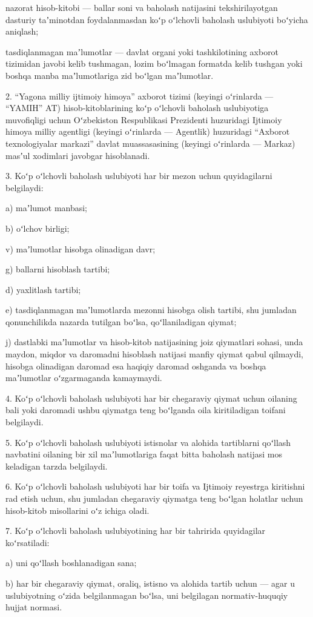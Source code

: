 \documentclass[14pt,a4paper]{extarticle}
\newcommand{\norm}[1]{\par\noindent\hspace*{1.27cm}#1. }
\newcommand{\sub}[1]{\par\noindent\hspace*{1.27cm}#1 }
\begin{document}
nazorat hisob-kitobi — ballar soni va baholash natijasini tekshirilayotgan dasturiy taʼminotdan foydalanmasdan koʻp oʻlchovli baholash uslubiyoti boʻyicha aniqlash;

tasdiqlanmagan maʼlumotlar — davlat organi yoki tashkilotining axborot tizimidan javobi kelib tushmagan, lozim boʻlmagan formatda kelib tushgan yoki boshqa manba maʼlumotlariga zid boʻlgan maʼlumotlar.

\norm{2}“Yagona milliy ijtimoiy himoya” axborot tizimi (keyingi oʻrinlarda — “YAMIH” AT) hisob-kitoblarining koʻp oʻlchovli baholash uslubiyotiga muvofiqligi uchun Oʻzbekiston Respublikasi Prezidenti huzuridagi Ijtimoiy himoya milliy agentligi (keyingi oʻrinlarda — Agentlik) huzuridagi “Axborot texnologiyalar markazi” davlat muassasasining (keyingi oʻrinlarda — Markaz) masʼul xodimlari javobgar hisoblanadi.

\norm{3}Koʻp oʻlchovli baholash uslubiyoti har bir mezon uchun quyidagilarni belgilaydi:
\sub{a)}maʼlumot manbasi;
\sub{b)}oʻlchov birligi;
\sub{v)}maʼlumotlar hisobga olinadigan davr;
\sub{g)}ballarni hisoblash tartibi;
\sub{d)}yaxlitlash tartibi;
\sub{e)}tasdiqlanmagan maʼlumotlarda mezonni hisobga olish tartibi, shu jumladan qonunchilikda nazarda tutilgan boʻlsa, qoʻllaniladigan qiymat;
\sub{j)}dastlabki maʼlumotlar va hisob-kitob natijasining joiz qiymatlari sohasi, unda maydon, miqdor va daromadni hisoblash natijasi manfiy qiymat qabul qilmaydi, hisobga olinadigan daromad esa haqiqiy daromad oshganda va boshqa maʼlumotlar oʻzgarmaganda kamaymaydi.

\norm{4}Koʻp oʻlchovli baholash uslubiyoti har bir chegaraviy qiymat uchun oilaning bali yoki daromadi ushbu qiymatga teng boʻlganda oila kiritiladigan toifani belgilaydi.

\norm{5}Koʻp oʻlchovli baholash uslubiyoti istisnolar va alohida tartiblarni qoʻllash navbatini oilaning bir xil maʼlumotlariga faqat bitta baholash natijasi mos keladigan tarzda belgilaydi.

\norm{6}Koʻp oʻlchovli baholash uslubiyoti har bir toifa va Ijtimoiy reyestrga kiritishni rad etish uchun, shu jumladan chegaraviy qiymatga teng boʻlgan holatlar uchun hisob-kitob misollarini oʻz ichiga oladi.

\norm{7}Koʻp oʻlchovli baholash uslubiyotining har bir tahririda quyidagilar koʻrsatiladi:
\sub{a)}uni qoʻllash boshlanadigan sana;
\sub{b)}har bir chegaraviy qiymat, oraliq, istisno va alohida tartib uchun — agar u uslubiyotning oʻzida belgilanmagan boʻlsa, uni belgilagan normativ-huquqiy hujjat normasi.
\end{document}

